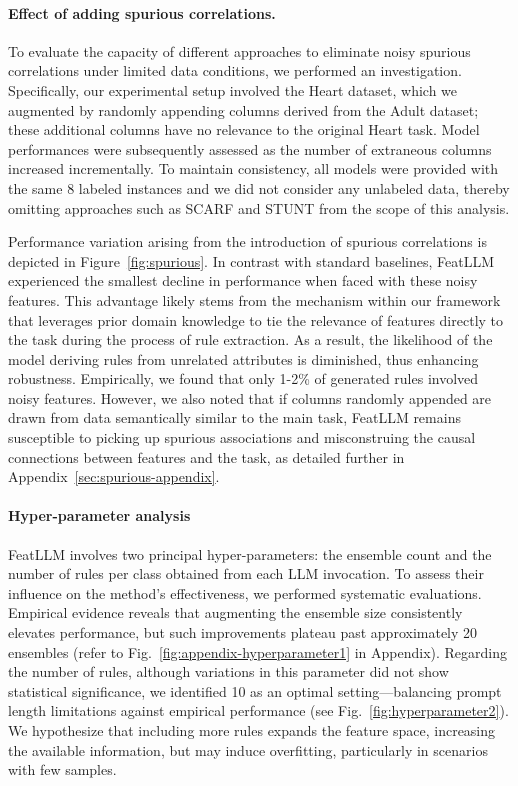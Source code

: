 \vspace*{-0.12in}
\paragraph{Effect of adding spurious correlations.} To evaluate the capacity of different approaches to eliminate noisy spurious correlations under limited data conditions, we performed an investigation. Specifically, our experimental setup involved the Heart dataset, which we augmented by randomly appending columns derived from the Adult dataset; these additional columns have no relevance to the original Heart task. Model performances were subsequently assessed as the number of extraneous columns increased incrementally. To maintain consistency, all models were provided with the same 8 labeled instances and we did not consider any unlabeled data, thereby omitting approaches such as SCARF and STUNT from the scope of this analysis.

Performance variation arising from the introduction of spurious correlations is depicted in Figure~\ref{fig:spurious}. In contrast with standard baselines, \textsf{FeatLLM} experienced the smallest decline in performance when faced with these noisy features. This advantage likely stems from the mechanism within our framework that leverages prior domain knowledge to tie the relevance of features directly to the task during the process of rule extraction. As a result, the likelihood of the model deriving rules from unrelated attributes is diminished, thus enhancing robustness. Empirically, we found that only 1-2\% of generated rules involved noisy features. However, we also noted that if columns randomly appended are drawn from data semantically similar to the main task, \textsf{FeatLLM} remains susceptible to picking up spurious associations and misconstruing the causal connections between features and the task, as detailed further in Appendix~\ref{sec:spurious-appendix}.

\vspace*{-0.12in}
\paragraph{Hyper-parameter analysis}
\textsf{FeatLLM} involves two principal hyper-parameters: the ensemble count and the number of rules per class obtained from each LLM invocation. To assess their influence on the method's effectiveness, we performed systematic evaluations. Empirical evidence reveals that augmenting the ensemble size consistently elevates performance, but such improvements plateau past approximately 20 ensembles (refer to Fig.~\ref{fig:appendix-hyperparameter1} in Appendix). Regarding the number of rules, although variations in this parameter did not show statistical significance, we identified 10 as an optimal setting—balancing prompt length limitations against empirical performance (see Fig.~\ref{fig:hyperparameter2}). We hypothesize that including more rules expands the feature space, increasing the available information, but may induce overfitting, particularly in scenarios with few samples.

